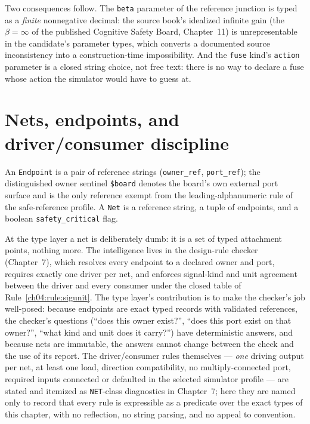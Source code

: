 Two consequences follow. The \texttt{beta} parameter of the
reference junction is typed as a \emph{finite} nonnegative decimal: the
source book's idealized infinite gain (the $\beta = \infty$ of the
published Cognitive Safety Board, Chapter~11) is
unrepresentable in the candidate's parameter types, which converts a
documented source inconsistency into a construction-time impossibility.
And the \texttt{fuse} kind's \texttt{action} parameter is a closed string
choice, not free text: there is no way to declare a fuse whose action the
simulator would have to guess at.

\section{Nets, endpoints, and driver/consumer discipline}
\label{ch04:sec:nets}

\begin{definition}\label{ch04:def:net}
An \texttt{Endpoint} is a pair of reference strings
(\texttt{owner\_ref}, \texttt{port\_ref}); the distinguished owner sentinel
\texttt{\$board} denotes the board's own external port surface and is the
only reference exempt from the leading-alphanumeric rule of the
safe-reference profile. A \texttt{Net} is a reference string, a tuple of
endpoints, and a boolean \texttt{safety\_critical} flag.
\end{definition}

At the type layer a net is deliberately dumb: it is a set of typed
attachment points, nothing more. The intelligence lives in the design-rule
checker (Chapter~7), which resolves every endpoint to a
declared owner and port, requires exactly one driver per net, and enforces
signal-kind and unit agreement between the driver and every consumer under
the closed table of Rule~\ref{ch04:rule:sigunit}. The type layer's
contribution is to make the checker's job well-posed: because endpoints are
exact typed records with validated references, the checker's questions
(``does this owner exist?'', ``does this port exist on that owner?'',
``what kind and unit does it carry?'') have deterministic answers, and
because nets are immutable, the answers cannot change between the check and
the use of its report. The driver/consumer rules themselves ---
\emph{one} driving output per net, at least one load, direction
compatibility, no multiply-connected port, required inputs connected or
defaulted in the selected simulator profile --- are stated and itemized as
\texttt{NET}-class diagnostics in Chapter~7; here they are
named only to record that every rule is expressible as a predicate over the
exact types of this chapter, with no reflection, no string parsing, and no
appeal to convention.

